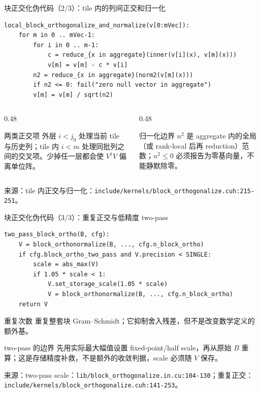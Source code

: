 \documentclass[UTF8,aspectratio=169,11pt]{ctexbeamer}
\newcommand{\source}[1]{\vspace{0.05em}\par{\raggedright\scriptsize\color{muted}来源：#1\par}}
\newcommand{\codepath}[1]{\nolinkurl{#1}}
\begin{document}
\begin{frame}[fragile,t]{块正交化伪代码（2/3）：tile 内的列间正交和归一化}
  \begin{lstlisting}[firstnumber=1]
local_block_orthogonalize_and_normalize(v[0:mVec]):
    for m in 0 .. mVec-1:
        for i in 0 .. m-1:
            c = reduce_{x in aggregate}(inner(v[i](x), v[m](x)))
            v[m] = v[m] - c * v[i]
        n2 = reduce_{x in aggregate}(norm2(v[m](x)))
        if n2 <= 0: fail("zero null vector in aggregate")
        v[m] = v[m] / sqrt(n2)
  \end{lstlisting}
  \vspace{0.10cm}
  \begin{columns}[T,totalwidth=\textwidth]
    \begin{column}{0.48\textwidth}
      \begin{block}{两类正交项}
        外层 \(i<j_0\) 处理当前 tile 与历史列；tile 内 \(i<m\) 处理同批列之间的交叉项。少掉任一层都会使 \(V^\dagger V\) 偏离单位阵。
      \end{block}
    \end{column}
    \begin{column}{0.48\textwidth}
      \begin{alertblock}{归一化边界}
        \(n^2\) 是 aggregate 内的全局（或 rank-local 后再 reduction）范数；\(n^2\le0\) 必须报告为零基向量，不能静默除零。
      \end{alertblock}
    \end{column}
  \end{columns}
  \source{tile 内正交与归一化：\codepath{include/kernels/block_orthogonalize.cuh:215-251}。}
\end{frame}

\begin{frame}[fragile,t]{块正交化伪代码（3/3）：重复正交与低精度 two-pass}
  \begin{lstlisting}[firstnumber=1]
two_pass_block_ortho(B, cfg):
    V = block_orthonormalize(B, ..., cfg.n_block_ortho)
    if cfg.block_ortho_two_pass and V.precision < SINGLE:
        scale = abs_max(V)
        if 1.05 * scale < 1:
            V.set_storage_scale(1.05 * scale)
            V = block_orthonormalize(B, ..., cfg.n_block_ortho)
    return V
  \end{lstlisting}
  \vspace{0.10cm}
  \begin{block}{重复次数}
    \texttt{} 重复整套块 Gram--Schmidt；它抑制舍入残差，但不是改变数学定义的额外基。
  \end{block}
  \begin{alertblock}{two-pass 的边界}
    先用实际最大幅值设置 fixed-point/half scale，再从原始 \(B\) 重算；这是存储精度补救，不是额外的收敛判据，scale 必须随 \(V\) 保存。
  \end{alertblock}
  \source{two-pass scale：\codepath{lib/block_orthogonalize.in.cu:104-130}；重复正交：\codepath{include/kernels/block_orthogonalize.cuh:141-253}。}
\end{frame}
\end{document}
